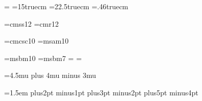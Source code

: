 %



\magnification= 
\hsize=15truecm
\vsize=22.5truecm
\hoffset=.46truecm

\font\titlefont=cmss12
\font\authorfont=cmr12

\font\csc=cmcsc10            %
\font\amsa=msam10
\def\eop{{\amsa \char"03}}  %

\font\tenbb=msbm10     %
\font\sevenbb=msbm7
\newfam\bbfam \def\bb{\fam\bbfam\tenbb}  %
\textfont\bbfam=\tenbb
\scriptfont\bbfam=\sevenbb

\def\Pt{Pythagorean triple}
\def\natn{{\bb N}}     %
\def\intz{{\bb Z}}     %
\def\ratq{{\bb Q}}     %
\def\x{{\underline x}} %
\def\Int{{\rm Int}}    %

\let\congr=\equiv  %

\def\[{{\rm[}} \def\]{\/{\rm]}}
\def\({{\rm(}} \def\){\/{\rm)}}

\long{}

\def\proof{\noindent {\it Proof.\enspace}}
\def\endproof{\ \eop\par%
   \ifdim\lastskip<\medskipamount
   \removelastskip\penalty-50\medskip\fi}

\thickmuskip=4.5mu plus 4mu minus 3mu  %
\mathsurround=0.5pt

   

\baselineskip=13pt \parskip=1.5pt \parindent=1.5em
\smallskipamount=4pt plus2pt minus1pt %
\medskipamount=7pt plus3pt minus2pt %
\bigskipamount=15pt plus5pt minus4pt %


